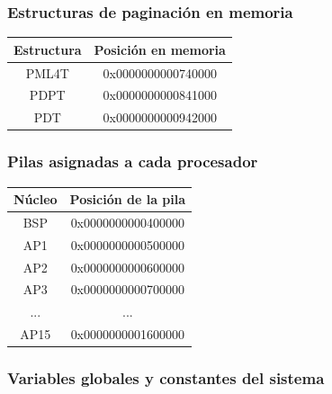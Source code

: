 \subsubsection{Estructuras de paginación en memoria}
\begin{center}
    \begin{tabular}{|c|c|}
        \hline
        Estructura & Posición en memoria\\
        \hline
        PML4T & 0x0000000000740000\\
        \hline
        PDPT & 0x0000000000841000\\
        \hline
        PDT & 0x0000000000942000\\
        \hline
    \end{tabular}
\end{center}

\subsubsection{Pilas asignadas a cada procesador}

\begin{center}
    \begin{tabular}{|c|c|}
        \hline
        Núcleo & Posición de la pila\\
        \hline
        BSP & 0x0000000000400000\\
        \hline
        AP1 & 0x0000000000500000\\
        \hline
        AP2 & 0x0000000000600000\\
        \hline
        AP3 & 0x0000000000700000\\
        \hline
        ... & ...\\
        \hline
        AP15 & 0x0000000001600000\\
        \hline
    \end{tabular}
\end{center}

\subsubsection{Variables globales y constantes del sistema}

